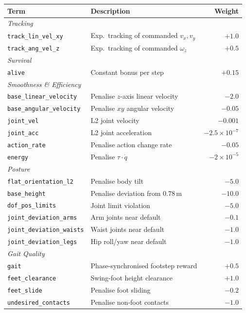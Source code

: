 \documentclass{article}
\begin{document}
\begin{center}
\begin{tabular}{llr}
  \toprule
  \textbf{Term} & \textbf{Description} & \textbf{Weight} \\
  \midrule
  \multicolumn{3}{l}{\textit{Tracking}} \\
  \quad\texttt{track\_lin\_vel\_xy} & Exp.\ tracking of commanded $v_x, v_y$ & $+1.0$ \\
  \quad\texttt{track\_ang\_vel\_z} & Exp.\ tracking of commanded $\omega_z$ & $+0.5$ \\
  \midrule
  \multicolumn{3}{l}{\textit{Survival}} \\
  \quad\texttt{alive} & Constant bonus per step & $+0.15$ \\
  \midrule
  \multicolumn{3}{l}{\textit{Smoothness \& Efficiency}} \\
  \quad\texttt{base\_linear\_velocity} & Penalise $z$-axis linear velocity & $-2.0$ \\
  \quad\texttt{base\_angular\_velocity} & Penalise $xy$ angular velocity & $-0.05$ \\
  \quad\texttt{joint\_vel} & L2 joint velocity & $-0.001$ \\
  \quad\texttt{joint\_acc} & L2 joint acceleration & $-2.5\times10^{-7}$ \\
  \quad\texttt{action\_rate} & Penalise action change rate & $-0.05$ \\
  \quad\texttt{energy} & Penalise $\tau \cdot \dot{q}$ & $-2\times10^{-5}$ \\
  \midrule
  \multicolumn{3}{l}{\textit{Posture}} \\
  \quad\texttt{flat\_orientation\_l2} & Penalise body tilt & $-5.0$ \\
  \quad\texttt{base\_height} & Penalise deviation from 0.78\,m & $-10.0$ \\
  \quad\texttt{dof\_pos\_limits} & Joint limit violation & $-5.0$ \\
  \quad\texttt{joint\_deviation\_arms} & Arm joints near default & $-0.1$ \\
  \quad\texttt{joint\_deviation\_waists} & Waist joints near default & $-1.0$ \\
  \quad\texttt{joint\_deviation\_legs} & Hip roll/yaw near default & $-1.0$ \\
  \midrule
  \multicolumn{3}{l}{\textit{Gait Quality}} \\
  \quad\texttt{gait} & Phase-synchronised footstep reward & $+0.5$ \\
  \quad\texttt{feet\_clearance} & Swing-foot height clearance & $+1.0$ \\
  \quad\texttt{feet\_slide} & Penalise foot sliding & $-0.2$ \\
  \quad\texttt{undesired\_contacts} & Penalise non-foot contacts & $-1.0$ \\
  \bottomrule
\end{tabular}
\end{center}
\end{document}
